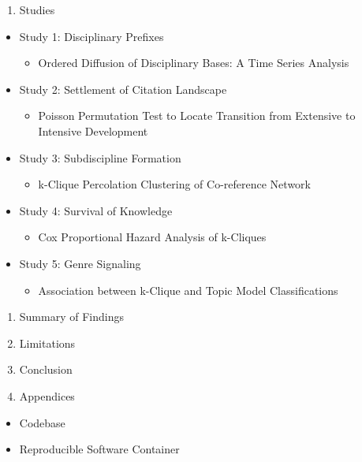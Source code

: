 \documentclass[]{article}
\providecommand{\tightlist}{%
  \setlength{\itemsep}{0pt}\setlength{\parskip}{0pt}}
\begin{document}
\begin{enumerate}
\def\labelenumi{\arabic{enumi}.}
\setcounter{enumi}{5}
\tightlist
\item
  Studies
\end{enumerate}

\begin{itemize}
\tightlist
\item
  Study 1: Disciplinary Prefixes

  \begin{itemize}
  \tightlist
  \item
    Ordered Diffusion of Disciplinary Bases: A Time Series Analysis
  \end{itemize}
\item
  Study 2: Settlement of Citation Landscape

  \begin{itemize}
  \tightlist
  \item
    Poisson Permutation Test to Locate Transition from Extensive to
    Intensive Development
  \end{itemize}
\item
  Study 3: Subdiscipline Formation

  \begin{itemize}
  \tightlist
  \item
    k-Clique Percolation Clustering of Co-reference Network
  \end{itemize}
\item
  Study 4: Survival of Knowledge

  \begin{itemize}
  \tightlist
  \item
    Cox Proportional Hazard Analysis of k-Cliques
  \end{itemize}
\item
  Study 5: Genre Signaling

  \begin{itemize}
  \tightlist
  \item
    Association between k-Clique and Topic Model Classifications
  \end{itemize}
\end{itemize}

\begin{enumerate}
\def\labelenumi{\arabic{enumi}.}
\setcounter{enumi}{6}
\tightlist
\item
  Summary of Findings
\item
  Limitations
\item
  Conclusion
\item
  Appendices
\end{enumerate}

\begin{itemize}
\tightlist
\item
  Codebase
\item
  Reproducible Software Container
\end{itemize}
\end{document}
